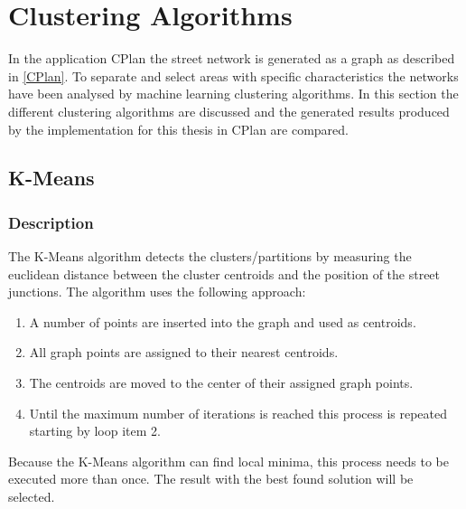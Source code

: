 \section{Clustering Algorithms}
\label{sec:clustering_algorithms}
In the application CPlan the street network is generated as a graph as described in \ref{CPlan}. To separate and select areas with specific characteristics the networks have been analysed by machine learning clustering algorithms. In this section the different clustering algorithms are discussed and the generated results produced by the implementation for this thesis in CPlan are compared.

\subsection{K-Means}
\label{sec:K-Means}
\subsubsection{Description}
The K-Means algorithm detects the clusters/partitions by measuring the euclidean distance between the cluster centroids and the position of the street junctions. The algorithm uses the following approach:

\begin{enumerate}
    \item A number of points are inserted into the graph and used as centroids.
    \item All graph points are assigned to their nearest centroids.
    \item The centroids are moved to the center of their assigned graph points.
    \item Until the maximum number of iterations is reached this process is repeated starting by loop item 2.
\end{enumerate}

Because the K-Means algorithm can find local minima, this process needs to be executed more than once. The result with the best found solution will be selected.
